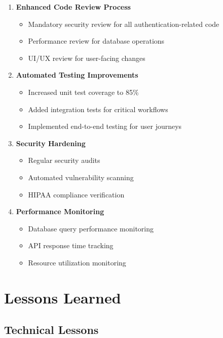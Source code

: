 \documentclass[12pt,a4paper]{article}
\begin{document}
\begin{enumerate}
    \item \textbf{Enhanced Code Review Process}
    \begin{itemize}
        \item Mandatory security review for all authentication-related code
        \item Performance review for database operations
        \item UI/UX review for user-facing changes
    \end{itemize}
    
    \item \textbf{Automated Testing Improvements}
    \begin{itemize}
        \item Increased unit test coverage to 85\%
        \item Added integration tests for critical workflows
        \item Implemented end-to-end testing for user journeys
    \end{itemize}
    
    \item \textbf{Security Hardening}
    \begin{itemize}
        \item Regular security audits
        \item Automated vulnerability scanning
        \item HIPAA compliance verification
    \end{itemize}
    
    \item \textbf{Performance Monitoring}
    \begin{itemize}
        \item Database query performance monitoring
        \item API response time tracking
        \item Resource utilization monitoring
    \end{itemize}
\end{enumerate}

\section{Lessons Learned}

\subsection{Technical Lessons}
\end{document}
